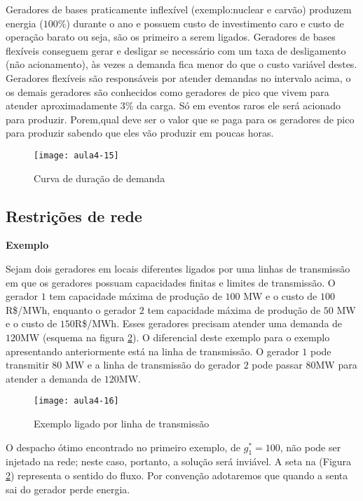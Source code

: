 Geradores de bases praticamente inflexível (exemplo:nuclear e carvão) produzem energia ($100\%$) durante o ano e possuem custo de investimento caro e custo de operação barato ou seja, são os primeiro a serem ligados. Geradores de bases flexíveis conseguem gerar e desligar se necessário com um taxa de desligamento (não acionamento), às vezes a demanda fica menor do que o custo variável destes. Geradores flexíveis  são responsáveis por atender demandas no intervalo acima, o os demais geradores são conhecidos como geradores de pico que vivem para atender aproximadamente 3\% da carga. Só em eventos raros ele será acionado para produzir. Porem,qual deve ser o valor que se paga para os geradores de pico para produzir sabendo que eles vão produzir em poucas horas.
\begin{figure}[H]
\begin{centering}
\texttt{[image: aula4-15]}\protect\caption{\label{fig:aula4-15}  Curva de duração de demanda}
\end{centering}
\end{figure}

\subsection{Restrições de rede}
\textbf{Exemplo}

Sejam dois geradores em locais diferentes ligados por uma linhas de transmissão em que os geradores possuam capacidades finitas e limites de transmissão. O gerador $1$ tem capacidade máxima de produção de $100$ MW e o custo de $100$R\$/MWh, enquanto o  gerador $2$  tem capacidade máxima de produção de $50$ MW e o custo de $150$R\$/MWh. Esses geradores precisam atender uma demanda de $120$MW (esquema na figura \ref{fig:aula4-16}). O diferencial deste exemplo para o exemplo apresentando anteriormente está na linha de transmissão. O gerador $1$ pode transmitir $80$ MW e a linha de transmissão do gerador $2$ pode passar $80$MW para atender a demanda de $120$MW.
\begin{figure}[H]
\begin{centering}
\texttt{[image: aula4-16]}\protect\caption{\label{fig:aula4-16} Exemplo ligado por linha de transmissão}
\end{centering}
\end{figure}
O despacho ótimo encontrado no primeiro exemplo, de $g_{1}^{*}=100$, não pode ser injetado na rede; neste caso, portanto, a solução será inviável.
A seta na (Figura \ref{fig:aula4-16}) representa o sentido do fluxo. Por convenção adotaremos que quando a senta sai do gerador perde energia.

